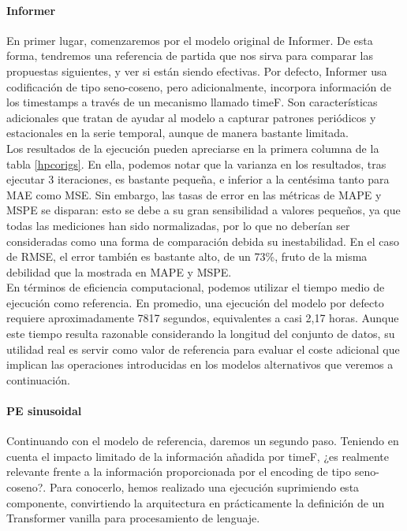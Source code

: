 \paragraph{Informer}

En primer lugar, comenzaremos por el modelo original de Informer. De esta forma, tendremos una referencia de partida que nos sirva para comparar las propuestas siguientes, y ver si están siendo efectivas. Por defecto, Informer usa codificación de tipo seno-coseno, pero adicionalmente, incorpora información de los timestamps a través de un mecanismo llamado timeF. Son características adicionales que tratan de ayudar al modelo a capturar patrones periódicos y estacionales en la serie temporal, aunque de manera bastante limitada.\\

Los resultados de la ejecución pueden apreciarse en la primera columna de la tabla \ref{hpcorigs}. En ella, podemos notar que la varianza en los resultados, tras ejecutar 3 iteraciones, es bastante pequeña, e inferior a la centésima tanto para MAE como MSE. Sin embargo, las tasas de error en las métricas de MAPE y MSPE se disparan: esto se debe a su gran sensibilidad a valores pequeños, ya que todas las mediciones han sido normalizadas, por lo que no deberían ser consideradas como una forma de comparación debida su inestabilidad. En el caso de RMSE, el error también es bastante alto, de un 73\%, fruto de la misma debilidad que la mostrada en MAPE y MSPE.\\

En términos de eficiencia computacional, podemos utilizar el tiempo medio de ejecución como referencia. En promedio, una ejecución del modelo por defecto requiere aproximadamente 7817 segundos, equivalentes a casi 2,17 horas. Aunque este tiempo resulta razonable considerando la longitud del conjunto de datos, su utilidad real es servir como valor de referencia para evaluar el coste adicional que implican las operaciones introducidas en los modelos alternativos que veremos a continuación.

\paragraph{PE sinusoidal}

Continuando con el modelo de referencia, daremos un segundo paso. Teniendo en cuenta el impacto limitado de la información añadida por timeF, ¿es realmente relevante frente a la información proporcionada por el encoding de tipo seno-coseno?. Para conocerlo, hemos realizado una ejecución suprimiendo esta componente, convirtiendo la arquitectura en prácticamente la definición de un Transformer vanilla para procesamiento de lenguaje.\\

